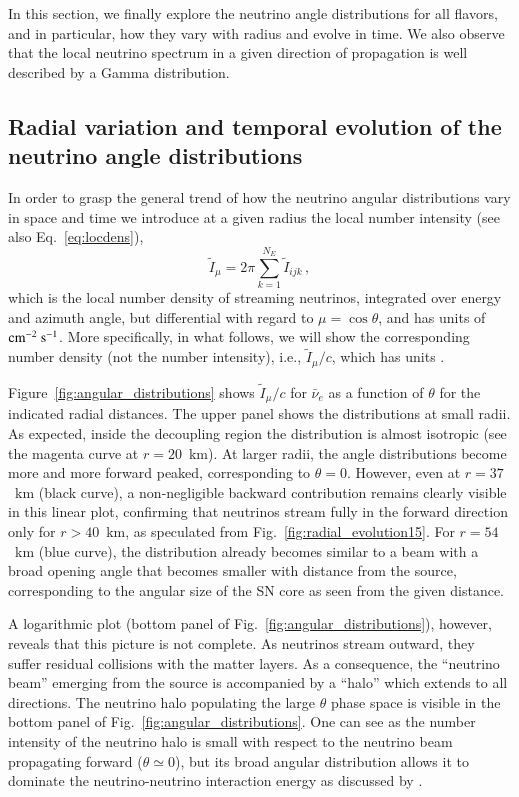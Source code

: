 \documentclass[iop,twocolappendix,numberedappendix]{emulateapj}
\begin{document}
In this section, we finally explore the neutrino angle distributions for all
flavors, and in particular, how they vary with radius and evolve in time. We
also observe that the local neutrino spectrum in a given direction of
propagation is well described by a Gamma distribution.

\subsection{Radial variation and temporal evolution of the neutrino angle distributions}

In order to grasp the general trend of how the neutrino angular distributions
vary in space and time we introduce at a given radius the local number
intensity (see also Eq.~\ref{eq:locdens}),
\begin{equation}
\tilde{I}_\mu = 2\pi\sum_{k=1}^{N_E} \tilde{I}_{ijk}\,,
\end{equation}
which is the local number density of streaming neutrinos, 
integrated over energy and azimuth angle, but
differential with regard to $\mu=\cos\theta$, and has units of ${\rm
cm}^{-2}~{\rm s}^{-1}$. 
More specifically, in what follows, we will show the corresponding
number density (not the number intensity), i.e., $\tilde{I}_{\mu}/c$,
which has units .

Figure~\ref{fig:angular_distributions} shows  $\tilde{I}_{\mu}/c$ for $\bar{\nu}_e$ as a 
function of $\theta$ for the indicated radial distances. The upper panel shows the distributions at small radii. As expected, inside
the decoupling region the distribution is almost isotropic (see the magenta
curve at $r=20$~km). At larger radii, the angle distributions become more and
more forward peaked, corresponding to $\theta = 0$. However, even at
$r=37$~km (black curve), a non-negligible backward contribution remains
clearly visible in this linear plot, confirming that neutrinos stream fully
in the forward direction only for $r > 40$~km, as speculated from
Fig.~\ref{fig:radial_evolution15}. For $r=54$~km (blue curve), the
distribution already becomes similar to a beam with a broad opening angle
that becomes smaller with distance from the source, corresponding to the
angular size of the SN core as seen from the given distance.

A logarithmic plot (bottom panel of
  Fig.~\ref{fig:angular_distributions}), however, reveals that this
  picture is not complete. As neutrinos stream outward, they suffer
  residual collisions with the matter layers. As a consequence, the
  ``neutrino beam'' emerging from the source is accompanied by a
  ``halo'' which extends to all directions. The neutrino halo
  populating the large $\theta$ phase space is visible in the bottom
  panel of Fig.~\ref{fig:angular_distributions}.  One can see as the
  number intensity of the neutrino halo is small with respect to the
  neutrino beam propagating forward ($\theta \simeq 0$), but its broad
  angular distribution allows it to dominate the neutrino-neutrino
  interaction energy as discussed by \cite{Sarikas:2012vb}.  
\end{document}
